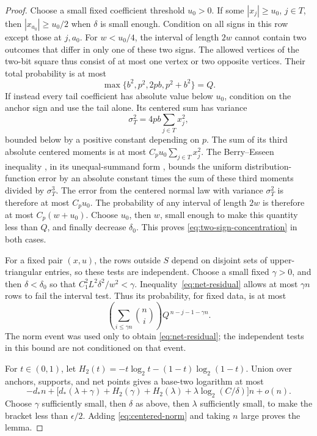 \begin{proof}
Choose a small fixed coefficient threshold \(u_0>0\). If some
\(|x_j|\ge u_0\), \(j\in T\), then
\(|x_{a_0}|\ge u_0/2\) when \(\delta\) is small enough.
Condition on all signs in this row except those at \(j,a_0\).
For \(w<u_0/4\), the interval of length \(2w\) cannot contain
two outcomes that differ in only one of these two signs.
The allowed vertices of the two-bit square thus consist of at
most one vertex or two opposite vertices. Their total probability
is at most
\[
 \max\{b^2,p^2,2pb,p^2+b^2\}=Q.
\]
If instead every tail coefficient has absolute value below \(u_0\),
condition on the anchor sign and use the tail alone.
Its centered sum has variance
\[
 \sigma_T^2=4pb\sum_{j\in T}x_j^2,
\]
bounded below by a positive constant depending on \(p\).
The sum of its third absolute centered moments is at most
\(C_pu_0\sum_{j\in T}x_j^2\). The Berry--Esseen inequality
\cite{Berry,Esseen}, in its unequal-summand form
\cite[Theorem, p.~586]{Tyurin}, bounds the uniform
distribution-function error by an absolute constant times the
sum of these third moments divided by \(\sigma_T^3\).
The error from the centered normal law with variance
\(\sigma_T^2\) is therefore at most \(C_pu_0\). The probability of any
interval of length \(2w\) is therefore at most \(C_p(w+u_0)\).
Choose \(u_0\), then \(w\), small enough to make this quantity
less than \(Q\), and finally decrease \(\delta_0\). This proves
\eqref{eq:two-sign-concentration} in both cases.

For a fixed pair \((x,u)\), the rows outside \(S\) depend on
disjoint sets of upper-triangular entries, so these tests are
independent. Choose a small fixed \(\gamma>0\), and then
\(\delta<\delta_0\) so that
\(C_1^2L^2\delta^2/w^2<\gamma\).
Inequality~\eqref{eq:net-residual} allows at most \(\gamma n\)
rows to fail the interval test. Thus its probability, for fixed
data, is at most
\[
 \left(\sum_{i\le\gamma n}\binom ni\right)
 Q^{\,n-j-1-\gamma n}.
\]
The norm event was used only to obtain \eqref{eq:net-residual};
the independent tests in this bound are not conditioned on that
event.

For \(t\in(0,1)\), let
\(H_2(t)=-t\log_2t-(1-t)\log_2(1-t)\).
Union over anchors, supports, and net points gives a base-two
logarithm at most
\[
 -d_*n+
 \bigl[d_*(\lambda+\gamma)+H_2(\gamma)+H_2(\lambda)
       +\lambda\log_2(C/\delta)\bigr]n+o(n).
\]
Choose \(\gamma\) sufficiently small, then \(\delta\) as above,
then \(\lambda\) sufficiently small, to make the bracket less
than \(\epsilon/2\). Adding \eqref{eq:centered-norm} and taking
\(n\) large proves the lemma.
\end{proof}

